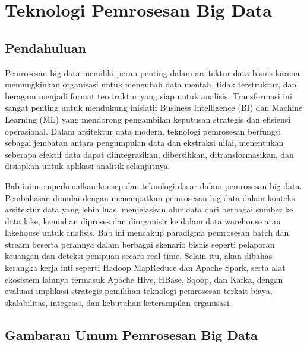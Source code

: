 \chapter{Teknologi Pemrosesan Big Data }

\section{Pendahuluan}

Pemrosesan big data memiliki peran penting dalam arsitektur data bisnis karena memungkinkan organisasi untuk mengubah data mentah, tidak terstruktur, dan beragam menjadi format terstruktur yang siap untuk analisis. Transformasi ini sangat penting untuk mendukung inisiatif Business Intelligence (BI) dan Machine Learning (ML) yang mendorong pengambilan keputusan strategis dan efisiensi operasional. Dalam arsitektur data modern, teknologi pemrosesan berfungsi sebagai jembatan antara pengumpulan data dan ekstraksi nilai, menentukan seberapa efektif data dapat diintegrasikan, dibersihkan, ditransformasikan, dan disiapkan untuk aplikasi analitik selanjutnya.

Bab ini memperkenalkan konsep dan teknologi dasar dalam pemrosesan big data. Pembahasan dimulai dengan menempatkan pemrosesan big data dalam konteks arsitektur data yang lebih luas, menjelaskan alur data dari berbagai sumber ke data lake, kemudian diproses dan diorganisir ke dalam data warehouse atau lakehouse untuk analisis. Bab ini mencakup paradigma pemrosesan batch dan stream beserta perannya dalam berbagai skenario bisnis seperti pelaporan keuangan dan deteksi penipuan secara real-time. Selain itu, akan dibahas kerangka kerja inti seperti Hadoop MapReduce dan Apache Spark, serta alat ekosistem lainnya termasuk Apache Hive, HBase, Sqoop, dan Kafka, dengan evaluasi implikasi strategis pemilihan teknologi pemrosesan terkait biaya, skalabilitas, integrasi, dan kebutuhan keterampilan organisasi.


\section{Gambaran Umum Pemrosesan Big Data}

